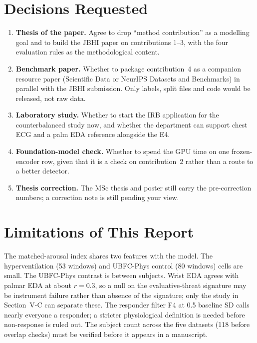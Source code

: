 \documentclass[journal]{IEEEtran}
\begin{document}
\section{Decisions Requested}
\begin{enumerate}
\item \textbf{Thesis of the paper.} Agree to drop ``method contribution'' as a modelling goal and to build the JBHI paper on contributions 1--3, with the four evaluation rules as the methodological content.
\item \textbf{Benchmark paper.} Whether to package contribution~4 as a companion resource paper (Scientific Data or NeurIPS Datasets and Benchmarks) in parallel with the JBHI submission. Only labels, split files and code would be released, not raw data.
\item \textbf{Laboratory study.} Whether to start the IRB application for the counterbalanced study now, and whether the department can support chest ECG and a palm EDA reference alongside the E4.
\item \textbf{Foundation-model check.} Whether to spend the GPU time on one frozen-encoder row, given that it is a check on contribution~2 rather than a route to a better detector.
\item \textbf{Thesis correction.} The MSc thesis and poster still carry the pre-correction numbers; a correction note is still pending your view.
\end{enumerate}

\section{Limitations of This Report}
The matched-arousal index shares two features with the model. The hyperventilation (53 windows) and UBFC-Phys control (80 windows) cells are small. The UBFC-Phys contrast is between subjects. Wrist EDA agrees with palmar EDA at about $r=0.3$, so a null on the evaluative-threat signature may be instrument failure rather than absence of the signature; only the study in Section~V-C can separate these. The responder filter F4 at 0.5 baseline SD calls nearly everyone a responder; a stricter physiological definition is needed before non-response is ruled out. The subject count across the five datasets (118 before overlap checks) must be verified before it appears in a manuscript.
\end{document}
